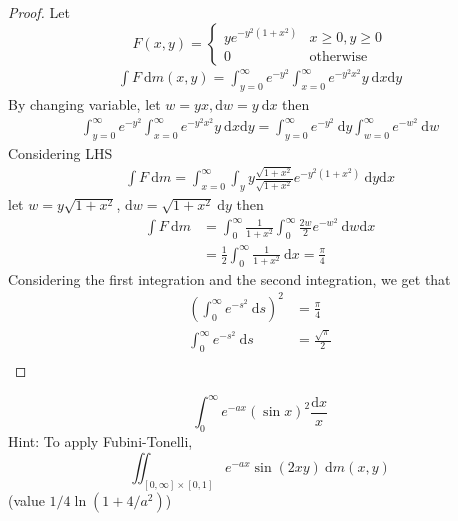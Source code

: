 \begin{proof}
  Let 
  \[
    F(x, y) = \begin{cases}
      ye^{-y^2(1+x^2)} & x \ge 0, y \ge 0 \\
      0 & \text{otherwise}
    \end{cases}
  \]
  \begin{align*}
    \int F \ \mathrm{d}m(x, y) = \int_{y=0}^\infty e^{-y^2}\int_{x=0}^\infty e^{-y^2x^2}y \ \mathrm{d}x\mathrm{d}y
  \end{align*}
  By changing variable, let $w = yx, \mathrm{d}w = y \ \mathrm{d}x$ then
  \begin{align*}
    \int_{y=0}^\infty e^{-y^2}\int_{x=0}^\infty e^{-y^2x^2}y \ \mathrm{d}x\mathrm{d}y = \int_{y=0}^\infty e^{-y^2}\ \mathrm{d}y \int_{w=0}^\infty e^{-w^2} \ \mathrm{d}w
  \end{align*}
  Considering LHS
  \begin{align*}
    \int F\ \mathrm{d}m = \int_{x=0}^\infty \int_y y \frac{\sqrt{1+x^2}}{\sqrt{1+x^2}} e^{-y^2(1+x^2)} \ \mathrm{d}y\mathrm{d}x 
  \end{align*}
  let $w = y \sqrt{1+x^2}$, $\mathrm{d}w = \sqrt{1+x^2} \ \mathrm{d}y$ then
  \begin{align*}
    \int F \ \mathrm{d}m &= \int_0^\infty \frac{1}{1+x^2} \int_0^\infty \frac{2w}2 e^{-w^2} \ \mathrm{d}w \mathrm{d}x \\
    &= \frac12 \int_0^\infty \frac1{1+x^2}\ \mathrm{d}x = \frac\pi4
  \end{align*}
  Considering the first integration and the second integration, we get that
  \begin{align*}
    \left(\int_0^\infty e^{-s^2} \ \mathrm{d}s\right)^2 &= \frac\pi4 \\
    \int_0^\infty e^{-s^2} \ \mathrm{d}s &= \frac{\sqrt{\pi}}2 \\
  \end{align*}
\end{proof}

\begin{example}
  \[\int_0^\infty e^{-ax} (\sin x)^2 \frac{\mathrm{d}x}x\]
  Hint: To apply Fubini-Tonelli, 
  \[\iint_{[0, \infty]\times[0, 1]} e^{-ax} \sin(2xy) \ \mathrm{d}m(x, y)\]
  (value $1/4 \ln(1+4/a^2)$)
\end{example}

